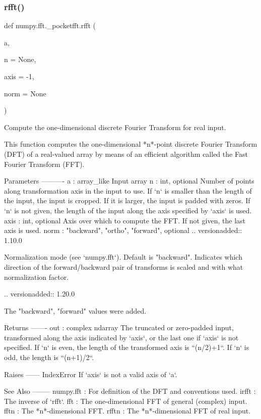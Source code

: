 \subsubsection{\texorpdfstring{rfft()}{rfft()}}
{\footnotesize\ttfamily def numpy.\+fft.\+\_\+pocketfft.\+rfft (\begin{DoxyParamCaption}\item[{}]{a,  }\item[{}]{n = {\ttfamily None},  }\item[{}]{axis = {\ttfamily -\/1},  }\item[{}]{norm = {\ttfamily None} }\end{DoxyParamCaption})}

\begin{DoxyVerb}Compute the one-dimensional discrete Fourier Transform for real input.

This function computes the one-dimensional *n*-point discrete Fourier
Transform (DFT) of a real-valued array by means of an efficient algorithm
called the Fast Fourier Transform (FFT).

Parameters
----------
a : array_like
    Input array
n : int, optional
    Number of points along transformation axis in the input to use.
    If `n` is smaller than the length of the input, the input is cropped.
    If it is larger, the input is padded with zeros. If `n` is not given,
    the length of the input along the axis specified by `axis` is used.
axis : int, optional
    Axis over which to compute the FFT. If not given, the last axis is
    used.
norm : {"backward", "ortho", "forward"}, optional
    .. versionadded:: 1.10.0

    Normalization mode (see `numpy.fft`). Default is "backward".
    Indicates which direction of the forward/backward pair of transforms
    is scaled and with what normalization factor.

    .. versionadded:: 1.20.0

        The "backward", "forward" values were added.

Returns
-------
out : complex ndarray
    The truncated or zero-padded input, transformed along the axis
    indicated by `axis`, or the last one if `axis` is not specified.
    If `n` is even, the length of the transformed axis is ``(n/2)+1``.
    If `n` is odd, the length is ``(n+1)/2``.

Raises
------
IndexError
    If `axis` is not a valid axis of `a`.

See Also
--------
numpy.fft : For definition of the DFT and conventions used.
irfft : The inverse of `rfft`.
fft : The one-dimensional FFT of general (complex) input.
fftn : The *n*-dimensional FFT.
rfftn : The *n*-dimensional FFT of real input.


\end{DoxyVerb}
